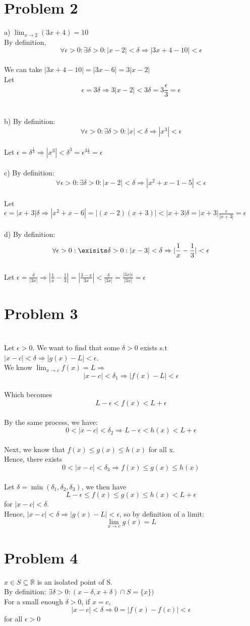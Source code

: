 \documentclass{article}
\begin{document}
\section*{Problem 2}
a) $\lim_{x \to 2} (3x+4) = 10$
\\By definition, $$\forall \epsilon > 0 : \exists \delta > 0 : |x - 2| < \delta \Rightarrow |3x + 4 - 10| < \epsilon$$
\\We can take $|3x + 4 - 10| = |3x - 6| = 3|x-2|$
\\Let $$\epsilon = 3\delta \Rightarrow 3|x -2| < 3\delta = 3\frac{\epsilon}{3} = \epsilon$$
\\
\\b) By definition: $$\forall \epsilon > 0 : \exists \delta > 0 : |x| < \delta \Rightarrow |x^3| < \epsilon$$
\\Let $\epsilon = \delta^{\frac{1}{3}} \Rightarrow |x^3| < \delta^3 = \epsilon^{3\frac{1}{3}} = \epsilon$
\\
\\c) By definition: $$\forall \epsilon > 0 : \exists \delta > 0 : |x - 2| < \delta \Rightarrow |x^2 + x - 1 - 5| < \epsilon$$
\\Let $\epsilon = |x+3|\delta \Rightarrow |x^2 + x -6| = |(x-2)(x+3)| < |x+3|\delta = |x+3|\frac{\epsilon}{|x+3|} = \epsilon$
\\
\\d) By definition: $$\forall \epsilon > 0 : \exisits \delta > 0 : |x-3| < \delta \Rightarrow |\frac{1}{x} - \frac{1}{3}| < \epsilon$$
\\Let $\epsilon = \frac{\delta}{|3x|} \Rightarrow |\frac{1}{x} - \frac{1}{3}| = |\frac{3-x}{3x}| < \frac{\delta}{|3x|} = \frac{|3x|\epsilon}{|3x|} = \epsilon$

\section*{Problem 3}
\\Let $\epsilon > 0$. We want to find that some $\delta > 0$ exists s.t $|x - c| < \delta \Rightarrow |g(x) - L| < \epsilon$.
\\We know $\lim_{x \to c}f(x) = L \Rightarrow$ $$|x - c| < \delta_1 \Rightarrow |f(x) - L| < \epsilon$$
\\Which becomes $$L - \epsilon < f(x) < L + \epsilon$$
\\By the same process, we have: $$0< |x - c| < \delta_2 \Rightarrow L - \epsilon < h(x) < L + \epsilon$$
\\Next, we know that $f(x) \leq g(x) \leq h(x)$ for all x.
\\Hence, there exists $$0 < |x - c| < \delta_3 \Rightarrow f(x) \leq g(x) \leq h(x)$$
\\Let $\delta = \min(\delta_1,\delta_2,\delta_3)$, we then have $$L - \epsilon \leq f(x) \leq g(x) \leq h(x) < L + \epsilon$$ for $|x - c| < \delta$.
\\Hence, $|x - c| < \delta \Rightarrow |g(x) - L| < \epsilon$, so by definition of a limit: $$\lim_{x \to c} g(x) = L$$

\section*{Problem 4}
$x \in S \subseteq \mathbb{R}$ is an isolated point of S.
\\By definition: $\exists \delta > 0 : (x- \delta, x+\delta) \cap S = \{x\})$
\\For a small enough $\delta > 0$, if $x = c$, $$|x - c| < \delta \Rightarrow 0 = |f(x) - f(c)| < \epsilon$$ for all $\epsilon > 0$
\end{document}
